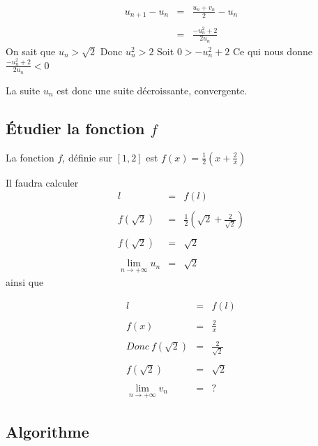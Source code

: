 \documentclass[
]{article}
\begin{document}
\[
\begin{eqnarray*}
u_{n+1}-u_n & = & \frac{u_n+v_n}{2}-u_n \\\\
            & = & \frac{-u_n^2+2}{2u_n}
\end{eqnarray*}
\] On sait que \(u_n > \sqrt{2}\) Donc \(u_n^2 > 2\) Soit
\(0 > -u_n^2+2\) Ce qui nous donne \(\frac{-u_n^2+2}{2u_n} < 0\)

La suite \(u_n\) est donc une suite décroissante, convergente.

\hypertarget{uxe9tudier-la-fonction-f}{%
\subsection{\texorpdfstring{Étudier la fonction
\(f\)}{Étudier la fonction f}}\label{uxe9tudier-la-fonction-f}}

La fonction \(f\), définie sur \([1,2]\) est
\(f(x)=\frac12(x+\frac{2}{x})\)

Il faudra calculer\\
\[
\begin{eqnarray*}
                                      l & = & f(l)                                                        \\\\
                            f(\sqrt{2}) & = & \frac{1}{2} (\sqrt{2} + \frac{2}{\sqrt{2}})                    \\\\
                            f(\sqrt{2}) & = & \sqrt{2}                                                      \\\\
\lim\limits_{n \rightarrow +\infty} u_n & = & \sqrt{2}
\end{eqnarray*}
\] ainsi que

\[
\begin{eqnarray*}
l & = & f(l)\\\\
f(x) & = & \frac2x\\\\
Donc \ f(\sqrt{2}) & = & \frac2{\sqrt{2}}\\\\
f(\sqrt{2}) & = & \sqrt{2} \\\\
\lim\limits_{n \rightarrow +\infty} v_n & = & ?
\end{eqnarray*}
\]

\hypertarget{algorithme}{%
\subsection{Algorithme}\label{algorithme}}
\end{document}
